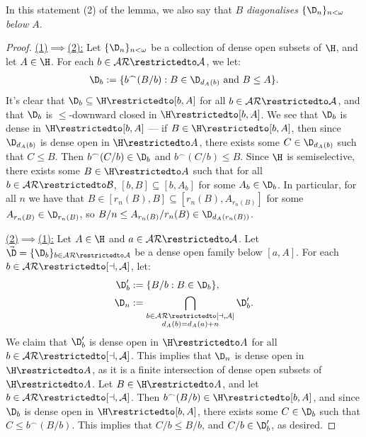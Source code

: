 \documentclass[11pt,reqno]{amsart}
\begin{document}
In this statement (2) of the lemma, we also say that $B$ \emph{diagonalises $\{\D_n\}_{n<\omega}$ below $A$}.

\begin{proof}
    \underline{(1)$\implies$(2):} Let $\{\D_n\}_{n<\omega}$ be a collection of dense open subsets of $\H$, and let $A \in \H$. For each $b \in \cal{AR}\restrictedto A$, we let:
    \begin{align*}
        \D_b := \{b^\frown(B/b) : B \in \D_{d_A(b)} \text{ and } B \leq A\}.
    \end{align*}
    It's clear that $\D_b \subseteq \H\restrictedto[b,A]$ for all $b \in \cal{AR}\restrictedto A$, and that $\D_b$ is $\leq$-downward closed in $\H\restrictedto[b,A]$. We see that $\D_b$ is dense in $\H\restrictedto[b,A]$ --- if $B \in \H\restrictedto[b,A]$, then since $\D_{d_A(b)}$ is dense open in $\H\restrictedto A$, there exists some $C \in \D_{d_A(b)}$ such that $C \leq B$. Then $b^\frown(C/b) \in \D_b$ and $b^\frown(C/b) \leq B$. Since $\H$ is semiselective, there exists some $B \in \H\restrictedto A$ such that for all $b \in \cal{AR}\restrictedto B$, $[b,B] \subseteq [b,A_b]$ for some $A_b \in \D_b$. In particular, for all $n$ we have that $B \in [r_n(B),B] \subseteq [r_n(B),A_{r_n(B)}]$ for some $A_{r_n(B)} \in \D_{r_n(B)}$, so $B/n \leq A_{r_n(B)}/r_n(B) \in \D_{d_A(r_n(B))}$.

    \underline{(2)$\implies$(1):} Let $A \in \H$ and $a \in \cal{AR}\restrictedto A$. Let $\vec{\D} = \{\D_b\}_{b \in \cal{AR}\restrictedto A}$ be a dense open family below $[a,A]$. For each $b \in \cal{AR}\restrictedto[a,A]$, let:
    \begin{align*}
        \D_b' &:= \{B/b : B \in \D_b\}, \\
        \D_n &:= \bigcap_{\substack{b \in \cal{AR}\restrictedto[a,A] \\ d_A(b) = d_A(a) + n}} \D_b'.
    \end{align*}
    We claim that $\D_b'$ is dense open in $\H\restrictedto A$ for all $b \in \cal{AR}\restrictedto[a,A]$. This implies that $\D_n$ is dense open in $\H\restrictedto A$, as it is a finite intersection of dense open subsets of $\H\restrictedto A$. Let $B \in \H\restrictedto A$, and let $b \in \cal{AR}\restrictedto[a,A]$. Then $b^\frown(B/b) \in \H\restrictedto[b,A]$, and since $\D_b$ is dense open in $\H\restrictedto[b,A]$, there exists some $C \in \D_b$ such that $C \leq b^\frown(B/b)$. This implies that $C/b \leq B/b$, and $C/b \in \D_b'$, as desired.


\end{proof}
\end{document}

